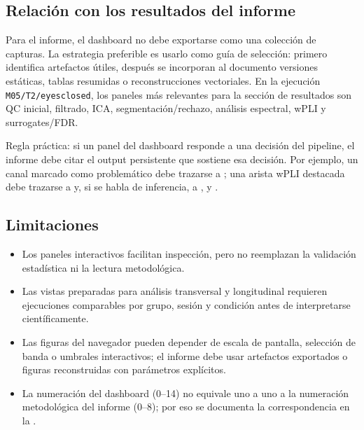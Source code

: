 \subsection{Relación con los resultados del informe}

Para el informe, el dashboard no debe exportarse como una colección de capturas. La estrategia preferible es usarlo como guía de selección: primero identifica artefactos útiles, después se incorporan al documento versiones estáticas, tablas resumidas o reconstrucciones vectoriales. En la ejecución \texttt{M05/T2/eyesclosed}, los paneles más relevantes para la sección de resultados son QC inicial, filtrado, ICA, segmentación/rechazo, análisis espectral, wPLI y surrogates/FDR.

\begin{controlqc}
Regla práctica: si un panel del dashboard responde a una decisión del pipeline, el informe debe citar el output persistente que sostiene esa decisión. Por ejemplo, un canal marcado como problemático debe trazarse a ; una arista wPLI destacada debe trazarse a  y, si se habla de inferencia, a ,  y .
\end{controlqc}

\subsection{Limitaciones}

\begin{itemize}[leftmargin=*,itemsep=2pt,topsep=2pt]
\item Los paneles interactivos facilitan inspección, pero no reemplazan la validación estadística ni la lectura metodológica.
\item Las vistas preparadas para análisis transversal y longitudinal requieren ejecuciones comparables por grupo, sesión y condición antes de interpretarse científicamente.
\item Las figuras del navegador pueden depender de escala de pantalla, selección de banda o umbrales interactivos; el informe debe usar artefactos exportados o figuras reconstruidas con parámetros explícitos.
\item La numeración del dashboard (0--14) no equivale uno a uno a la numeración metodológica del informe (0--8); por eso se documenta la correspondencia en la .
\end{itemize}

